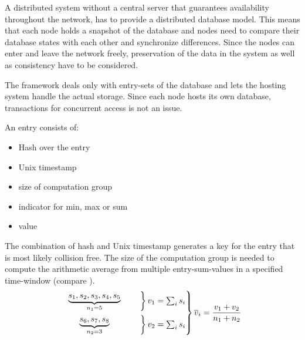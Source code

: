 A distributed system without a central server that guarantees availability throughout the network, has to provide a distributed database model. This means that each node holds a snapshot of the database and nodes need to compare their database states with each other and synchronize differences. Since the nodes can enter and leave the network freely, preservation of the data in the system as well as consistency have to be considered.

The framework deals only with entry-sets of the database and lets the hosting system handle the actual storage. Since each node hosts its own database, transactions for concurrent access is not an issue.

\noindent An entry consists of:
\begin{itemize}
	\item Hash over the entry
	\item Unix timestamp
	\item size of computation group
	\item indicator for min, max or sum
	\item value
\end{itemize}

The combination of hash and Unix timestamp generates a key for the entry that is most likely collision free. The size of the computation group is needed to compute the arithmetic average from multiple entry-sum-values in a specified time-window (compare ).
\begin{align}
\begin{rcases*}
\begin{rcases*}
\mathmakebox[2.5cm][c]{ \underbrace{s_1, s_2, s_3, s_4, s_5}_{n_1=5} }  & \quad
\end{rcases*} v_1=\sum_{i}s_i \\
\begin{rcases*}
\mathmakebox[2.5cm][c]{ \underbrace{s_6, s_7, s_8}_{n_2=3} } & \quad
\end{rcases*} v_2=\sum_{i}s_i
\end{rcases*} \overline{v}_i=\frac{v_1+v_2}{n_1+n_2} \label{eq:average of average}
\end{align}

